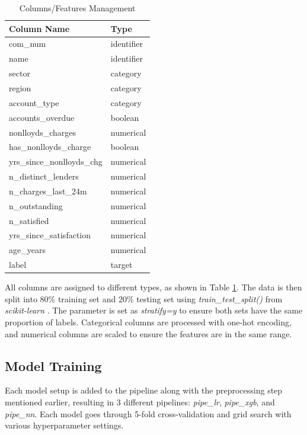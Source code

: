 \documentclass[ %
                    author={Natchalin Iwsakul \\[0.4em] Inkaphol Siriwongwattana \\[0.4em] Tanaphan Kummaraphat \\[0.6em] Patorn Srisupap},,
                supervisor={Fernando Moreno-Pino},
                    degree={MSc},
                     title={Propensity Modelling for SME Commercial Lending Using Open Public Data
},
                  subtitle={Companies House and GDELT as predictors of first-time borrowing},
                      type={},
                      year={2026}]{dissertation}
\begin{document}
  \begin{table}[h]
      \centering
      \begin{tabular}{ll}
      \toprule
          Column Name & Type \\
      \midrule
          com\_num & identifier \\
          name & identifier \\
          sector & category \\
          region & category \\
          account\_type & category \\
          accounts\_overdue & boolean \\
          nonlloyds\_charges & numerical \\
          has\_nonlloyds\_charge & boolean \\
          yrs\_since\_nonlloyds\_chg & numerical \\
          n\_distinct\_lenders & numerical \\
          n\_charges\_last\_24m & numerical \\
          n\_outstanding & numerical \\
          n\_satisfied & numerical \\
          yrs\_since\_satisfaction & numerical \\
          age\_years & numerical \\
          label & target \\
      \bottomrule
      \end{tabular}
      \caption{Columns/Features Management}
      \label{columnsmanagement}
  \end{table}
  
  All columns are assigned to different types, as shown in Table \ref{columnsmanagement}. The data is then split into 80\% training set and 20\% testing set using \textit{train\_test\_split()} from \textit{scikit-learn} \cite{Pedregosa_Scikit-learn_Machine_Learning_2011}. The parameter is set as \textit{stratify=y} to ensure both sets have the same proportion of labels. Categorical columns are processed with one-hot encoding, and numerical columns are scaled to ensure the features are in the same range.
    
  \subsection{Model Training}
  Each model setup is added to the pipeline along with the preprocessing step mentioned earlier, resulting in 3 different pipelines: \textit{pipe\_lr}, \textit{pipe\_xgb}, and \textit{pipe\_nn}. Each model goes through 5-fold cross-validation and grid search with various hyperparameter settings.
\end{document}
